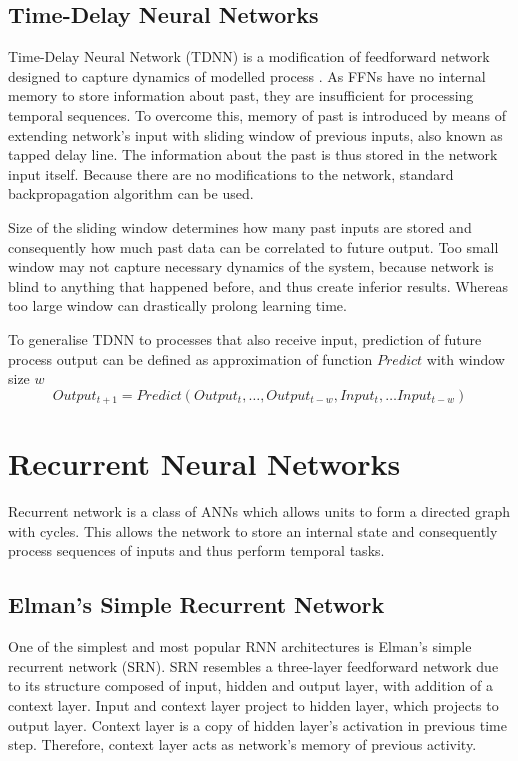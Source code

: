 \documentclass[12pt,oneside]{fithesis2}
\begin{document}

\subsection{Time-Delay Neural Networks}
Time-Delay Neural Network (TDNN) is a modification of feedforward network designed to capture dynamics of modelled process \cite{phoneme-recognition-tdnn}. As FFNs have no internal memory to store information about past, they are insufficient for processing temporal sequences. To overcome this, memory of past is introduced by means of extending network's input with sliding window of previous inputs, also known as tapped delay line. The information about the past is thus stored in the network input itself. Because there are no modifications to the network, standard backpropagation algorithm can be used.\par
Size of the sliding window determines how many past inputs are stored and consequently how much past data can be correlated to future output. Too small window may not capture necessary dynamics of the system, because network is blind to anything that happened before, and thus create inferior results. Whereas too large window can drastically prolong learning time.\par
To generalise TDNN to processes that also receive input, prediction of future process output can be defined as approximation of function $Predict$ with window size $w$
$$Output_{t+1} = Predict(Output_t, \dots, Output_{t-w}, Input_t, \dots Input_{t-w})$$

\section{Recurrent Neural Networks}
Recurrent network is a class of ANNs which allows units to form a directed graph with cycles. This allows the network to store an internal state and consequently process sequences of inputs and thus perform temporal tasks.



\subsection{Elman's Simple Recurrent Network}
One of the simplest and most popular RNN architectures is Elman's  simple recurrent network (SRN). SRN resembles a three-layer feedforward network due to its structure composed of input, hidden and output layer, with addition of a context layer. Input and context layer project to hidden layer, which projects to output layer. Context layer is a copy of hidden layer's activation in previous time step. Therefore, context layer acts as network's memory of previous activity.
\end{document}
